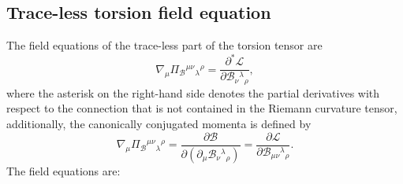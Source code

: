 \documentclass{article}
\providecommand{\B}[3]{\mathcal{B}_{#1}{}^{ #2}{}_{#3}}
\begin{document}
\subsection{Trace-less torsion field equation}

The field equations of the trace-less part of the torsion tensor are
\begin{equation}
    \nabla_\mu \Pi_{\mathcal{B}}{}^{\mu\nu}{}_{\lambda}{}^{\rho}  = \frac{\partial^* \mathcal{L}}{\partial \B{\nu}{\lambda}{\rho}},
\end{equation}
where the asterisk on the right-hand side denotes the partial derivatives with respect to the connection that is not
contained in the Riemann curvature tensor, additionally, the canonically conjugated momenta is defined by
\begin{equation}
    \nabla_\mu \Pi_{\mathcal{B}}{}^{\mu\nu}{}_{\lambda}{}^{\rho}  
    = \frac{\partial \mathcal{B}}{\partial \left(\partial_\mu \B{\nu}{\lambda}{\rho}\right)} 
    = \frac{\partial \mathcal{L}}{\partial  \B{\mu\nu}{\lambda}{\rho}}.
\end{equation}
The field equations are:
\end{document}
